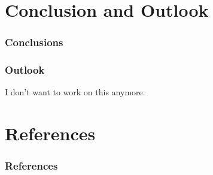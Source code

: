 \documentclass[10pt]{beamer}
\begin{document}
\section{Conclusion and Outlook}
\begin{frame}
	\frametitle{Conclusions}
	
\end{frame}

\begin{frame}
	\frametitle{Outlook}
	I don't want to work on this anymore.
\end{frame}

\section{References}
\begin{frame}
	\frametitle{References}
	\printbibliography
\end{frame}
\end{document}
